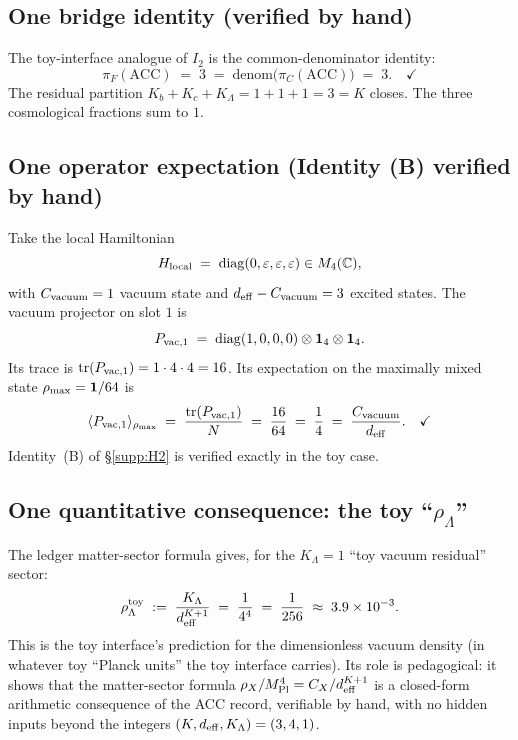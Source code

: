 \documentclass[11pt]{article}
\theoremstyle{plain}
\theoremstyle{definition}
\theoremstyle{remark}
\newcommand{\Mpl}{M_{\rm Pl}}
\begin{document}
\bigskip

\subsection{One bridge identity (verified by hand)}\label{supp:R4}

The toy-interface analogue of $I_2$ is the common-denominator identity:
\[
  \pi_F(\mathrm{ACC}) \;=\; 3 \;=\; \mathrm{denom}\bigl(\pi_C(\mathrm{ACC})\bigr) \;=\; 3. \quad \checkmark
\]
The residual partition $K_b + K_c + K_\Lambda = 1 + 1 + 1 = 3 = K$ closes.  The three cosmological fractions sum to $1$.

\bigskip

\subsection{One operator expectation (Identity (B) verified by hand)}\label{supp:R5}

Take the local Hamiltonian
\[
  H_{\rm local} \;=\; \mathrm{diag}(0, \varepsilon, \varepsilon, \varepsilon) \in M_4(\mathbb{C}),
\]
with $C_{\rm vacuum} = 1$ vacuum state and $d_{\rm eff} - C_{\rm vacuum} = 3$ excited states.  The vacuum projector on slot $1$ is
\[
  P_{{\rm vac},1} \;=\; \mathrm{diag}(1, 0, 0, 0) \otimes \mathbf{1}_4 \otimes \mathbf{1}_4.
\]
Its trace is $\mathrm{tr}(P_{{\rm vac},1}) = 1 \cdot 4 \cdot 4 = 16$.  Its expectation on the maximally mixed state $\rho_{\rm max} = \mathbf{1}/64$ is
\[
  \langle P_{{\rm vac},1} \rangle_{\rho_{\rm max}} \;=\; \frac{\mathrm{tr}(P_{{\rm vac},1})}{N} \;=\; \frac{16}{64} \;=\; \frac{1}{4} \;=\; \frac{C_{\rm vacuum}}{d_{\rm eff}}. \quad \checkmark
\]
Identity~(B) of §\ref{supp:H2} is verified exactly in the toy case.

\bigskip

\subsection{One quantitative consequence: the toy ``$\rho_\Lambda$''}\label{supp:R6}

The ledger matter-sector formula gives, for the $K_\Lambda = 1$ ``toy vacuum residual'' sector:
\[
  \rho_\Lambda^{\rm toy} \;:=\; \frac{K_\Lambda}{d_{\rm eff}^{K+1}} \;=\; \frac{1}{4^4} \;=\; \frac{1}{256} \;\approx\; 3.9 \times 10^{-3}.
\]
This is the toy interface's prediction for the dimensionless vacuum density (in whatever toy ``Planck units'' the toy interface carries).  Its role is pedagogical: it shows that the matter-sector formula $\rho_X / \Mpl^4 = C_X / d_{\rm eff}^{K+1}$ is a closed-form arithmetic consequence of the ACC record, verifiable by hand, with no hidden inputs beyond the integers $(K, d_{\rm eff}, K_\Lambda) = (3, 4, 1)$.
\end{document}
